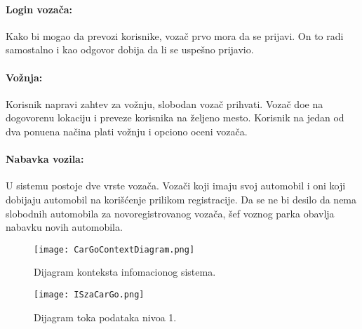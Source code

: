 \paragraph{Login voza\v ca:}
    Kako bi mogao da prevozi korisnike, voza\v c prvo mora da se prijavi. On to radi samostalno i kao odgovor dobija da li se uspe\v sno prijavio.
\paragraph{Vo\v znja:}
    Korisnik napravi zahtev za vo\v znju, slobodan voza\v c prihvati. Voza\v c do\dj e na dogovorenu lokaciju i preveze korisnika na \v zeljeno mesto. Korisnik na jedan od dva ponu\dj ena na\v cina plati vo\v znju i opciono oceni voza\v ca.
\paragraph{Nabavka vozila:}
    U sistemu postoje dve vrste voza\v ca. Voza\v ci koji imaju svoj automobil i oni koji dobijaju automobil na kori\v s\' cenje prilikom registracije. Da se ne bi desilo da nema slobodnih automobila za novoregistrovanog voza\v ca, \v sef voznog parka obavlja nabavku novih automobila.

\begin{figure}[H]
\begin{center}
\texttt{[image: CarGoContextDiagram.png]}
\end{center}
    \caption{Dijagram konteksta infomacionog sistema.}
\label{fig:CarGoContextDiagram}
\end{figure}

\begin{figure}[H]
\begin{center}
\texttt{[image: ISzaCarGo.png]}
\end{center}
    \caption{Dijagram toka podataka nivoa 1.}
\label{fig:dtp1}
\end{figure}

